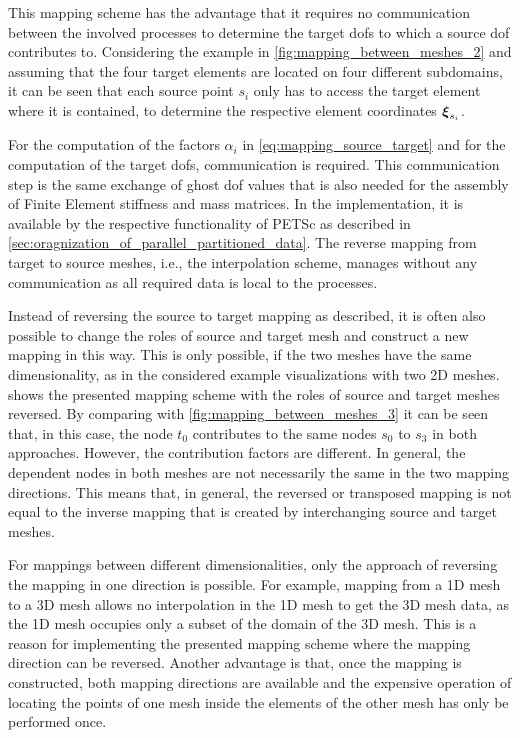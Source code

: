 This mapping scheme has the advantage that it requires no communication between the involved processes to determine the target dofs to which a source dof contributes to. Considering the example in \cref{fig:mapping_between_meshes_2} and assuming that the four target elements are located on four different subdomains, it can be seen that each source point $s_i$ only has to access the target element where it is contained, to determine the respective element coordinates $\boldsymbol{\xi}_{s_i}$.

For the computation of the factors $\alpha_i$ in \cref{eq:mapping_source_target} and for the computation of the target dofs, communication is required. This communication step is the same exchange of ghost dof values that is also needed for the assembly of Finite Element stiffness and mass matrices. In the implementation, it is available by the respective functionality of PETSc as described in \cref{sec:oragnization_of_parallel_partitioned_data}.
The reverse mapping from target to source meshes, i.e., the interpolation scheme, manages without any communication as all required data is local to the processes.

Instead of reversing the source to target mapping as described, it is often also possible to change the roles of source and target mesh and construct a new mapping in this way. This is only possible, if the two meshes have the same dimensionality, as in the considered example visualizations with two 2D meshes.  shows the presented mapping scheme with the roles of source and target meshes reversed.
By comparing with \cref{fig:mapping_between_meshes_3} it can be seen that, in this case, the node $t_0$ contributes to the same nodes $s_0$ to $s_3$ in both approaches. However, the contribution factors are different. In general, the dependent nodes in both meshes are not necessarily the same in the two mapping directions. This means that, in general, the reversed or transposed mapping is not equal to the inverse mapping that is created by interchanging source and target meshes.

For mappings between different dimensionalities, only the approach of reversing the mapping in one direction is possible. For example, mapping from a 1D mesh to a 3D mesh allows no interpolation in the 1D mesh to get the 3D mesh data, as the 1D mesh occupies only a subset of the domain of the 3D mesh. This is a reason for implementing the presented mapping scheme where the mapping direction can be reversed. Another advantage is that, once the mapping is constructed, both mapping directions are available and the expensive operation of locating the points of one mesh inside the elements of the other mesh has only be performed once.

